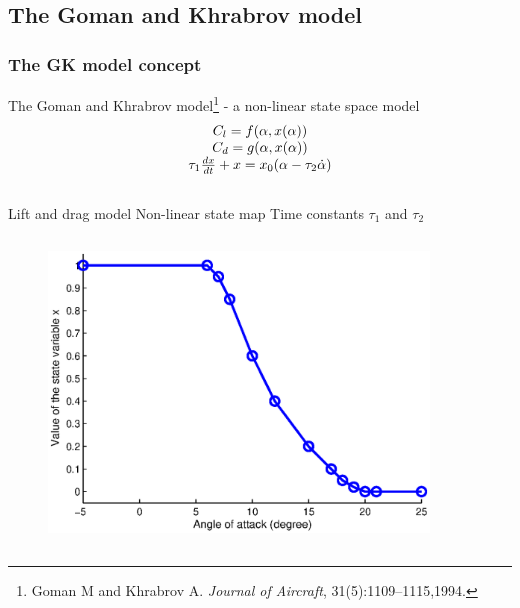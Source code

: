 \documentclass[compress]{beamer}
\begin{document}
\subsection{The Goman and Khrabrov model}

\begin{frame}
  \frametitle{The GK model concept}
  The Goman and Khrabrov model\footnote{Goman M and Khrabrov A. \emph{Journal of Aircraft}, 31(5):1109–1115,1994.} - a non-linear state space model
  \begin{equation*}
    \begin{array}[c]{c}
      C_l= f(\alpha,x(\alpha)) \\
      C_d= g(\alpha,x(\alpha)) \\
      \tau_1 \frac{dx}{dt} +x = x_0(\alpha - \tau_2 \dot{\alpha}) 
    \end{array}
  \end{equation*}

  \begin{columns}[t]
    Lift and drag model
    Non-linear state map
    Time constants $\tau_1$ and $\tau_2$
  \end{columns}

  \begin{columns}
    \begin{figure}[h]
      \begin{center}
	\includegraphics[width=0.9\textwidth]{./Figures/x_0_vs_alpha.eps}
      \end{center}
    \end{figure}
  \end{columns}
\end{frame}
\end{document}
